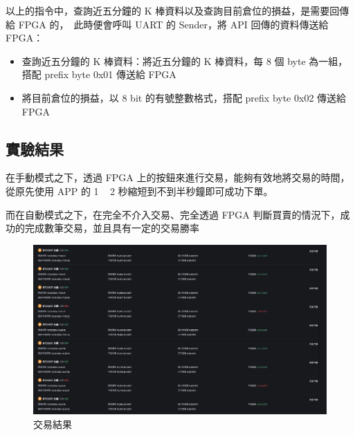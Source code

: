 \documentclass[10.5pt,compsoc,UTF8]{CjC}
\theoremstyle{mystyle}
\begin{document}
以上的指令中，查詢近五分鐘的 K 棒資料以及查詢目前倉位的損益，是需要回傳給 FPGA 的，\
此時便會呼叫 UART 的 Sender，將 API 回傳的資料傳送給 FPGA：
\begin{itemize}
  \item 查詢近五分鐘的 K 棒資料：將近五分鐘的 K 棒資料，每 8 個 byte 為一組，搭配 prefix byte 0x01 傳送給 FPGA
  \item 將目前倉位的損益，以 8 bit 的有號整數格式，搭配 prefix byte 0x02 傳送給 FPGA
\end{itemize}

\subsection{實驗結果}

在手動模式之下，透過 FPGA 上的按鈕來進行交易，能夠有效地將交易的時間，從原先使用 APP 的 1 ~ 2 秒縮短到不到半秒鐘即可成功下單。\
\par
而在自動模式之下，在完全不介入交易、完全透過 FPGA 判斷買賣的情況下，成功的完成數筆交易，並且具有一定的交易勝率

\begin{figure}[h!]
  \centering
  \includegraphics[width=\textwidth]{./img/trade-history.png}
  \caption{交易結果}
\end{figure}
\end{document}
